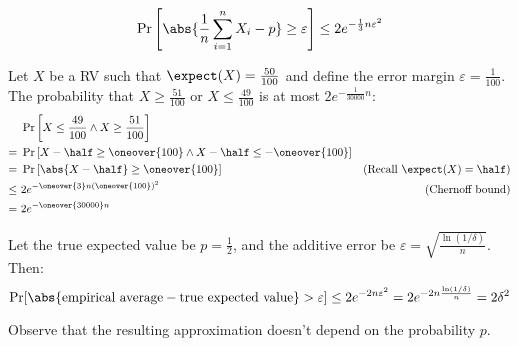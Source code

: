 \begin{equation}
    \Pr\left[\abs{\frac{1}{n}\sum_{i = 1}^{n} X_i - p} \geq \varepsilon\right] \leq 2e^{-\frac{1}{3}n\varepsilon^2}
\end{equation}

\begin{example}
    Let $X$ be a RV such that $\expect(X) = \frac{50}{100}$ and define the error margin $\varepsilon = \frac{1}{100}$. The probability that $X \geq \frac{51}{100}$ or $X \leq \frac{49}{100}$ is at most $2e^{-\frac{1}{30000}n}$:
    \begin{align*}
            &\ \Pr\left[X \leq \frac{49}{100} \wedge X \geq \frac{51}{100}\right]                   & \\
           =&\ \Pr\left[X - \half \geq \oneover{100} \wedge X - \half \leq - \oneover{100}\right]   & \\
           =&\ \Pr\left[\abs{X - \half} \geq \oneover{100}\right]                                   & \text{(Recall } \expect(X) = \half) \\
        \leq&\ 2e^{-\oneover{3} n \left(\oneover{100}\right)^2}                                     & \text{(Chernoff bound)} \\
           =&\ 2e^{-\oneover{30000}n}                                                               &
    \end{align*}
\end{example}

\begin{example}
    Let the true expected value be $p = \frac{1}{2}$, and the additive error be $\varepsilon = \sqrt{\frac{\ln(1/\delta)}{n}}$. Then:
    \[
        \Pr[\abs{\text{empirical average} - \text{true expected value}} > \varepsilon] \leq 2e^{-2n\varepsilon^2} = 2e^{-2n \frac{\ln(1/\delta)}{n}} = 2 \delta^2
    \]
    
    Observe that the resulting approximation doesn't depend on the probability $p$.
\end{example}
